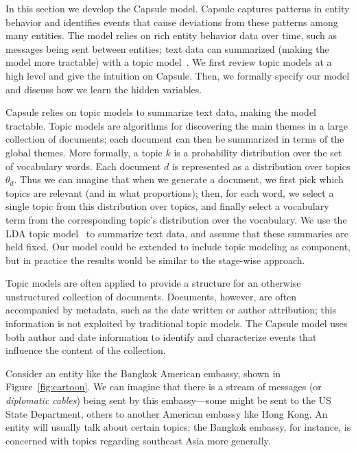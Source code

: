 
In this section we develop the Capsule model.  Capsule captures patterns in entity behavior and identifies events that cause deviations from these patterns among many entities.  The model relies on rich entity behavior data over time, such as messages being sent between entities; text data can summarized (making the model more tractable) with a topic model~\cite{Blei:2012}.  We first review topic models at a high level and give the intuition on Capsule.  Then, we formally specify our model and discuss how we learn the hidden variables.

 Capsule relies on topic models to summarize text data, making the model tractable.  Topic models are algorithms for discovering the main themes in a large collection of documents; each document can then be summarized in terms of the global themes.  More formally, a topic $k$ is a probability distribution over the set of vocabulary words.  Each document $d$ is represented as a distribution over topics $\theta_d$.  Thus we can imagine that when we generate a document, we first pick which topics are relevant (and in what proportions); then, for each word, we select a single topic from this distribution over topics, and finally select a vocabulary term from the corresponding topic's distribution over the vocabulary.  We use the LDA topic model~\cite{Blei:2003,Hoffman:2010} to summarize text data, and assume that these summaries are held fixed.  Our model could be extended to include topic modeling as component, but in practice the results would be similar to the stage-wise approach.

Topic models are often applied to provide a structure for an otherwise unstructured collection of documents.  Documents, however, are often accompanied by metadata, such as the date written or author attribution; this information is not exploited by traditional topic models.  The Capsule model uses both author and date information to identify and characterize events that influence the content of the collection.

Consider an entity like the Bangkok American embassy, shown in Figure~\ref{fig:cartoon}.  We can imagine that there is a stream of messages (or \emph{diplomatic cables}) being sent by this embassy---some might be sent to the US State Department, others to another American embassy like Hong Kong.  An entity will usually talk about certain topics; the Bangkok embassy, for instance, is concerned with topics regarding southeast Asia more generally.

